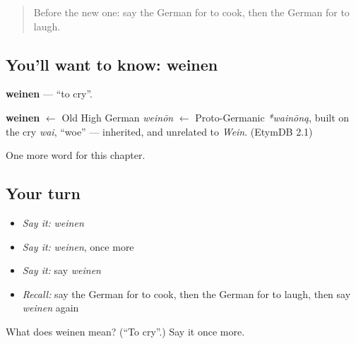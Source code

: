 \label{lesson:GE-C65-weinen}



\begin{quote}
Before the new one: say the German for to cook, then the German for to laugh.
\end{quote}

\subsection*{You'll want to know: weinen}
\textbf{weinen} — \textquotedblleft{}to cry\textquotedblright{}.

\begin{cousinweb}
\textbf{weinen} $\leftarrow$ Old High German \emph{weinōn} $\leftarrow$ Proto-Germanic \emph{*wainōną}, built on the cry \emph{wai}, \textquotedblleft{}woe\textquotedblright{} — inherited, and unrelated to \emph{Wein}. (EtymDB 2.1)
\end{cousinweb}

\begin{grammarlens}[title={What you've built}]
One more word for this chapter.
\end{grammarlens}

\subsection*{Your turn}
\begin{itemize}
\raggedright
  \item \emph{Say it:} \emph{weinen}
  \item \emph{Say it:} \emph{weinen}, once more
  \item \emph{Say it:} say \emph{weinen}
  \item \emph{Recall:} say the German for to cook, then the German for to laugh, then say \emph{weinen} again
\end{itemize}

\begin{tcolorbox}[breakable,colback=teal!4,colframe=teal!35!black,title={Before you move on}]
What does weinen mean? (\textquotedblleft{}To cry\textquotedblright{}.) Say it once more.
\end{tcolorbox}
